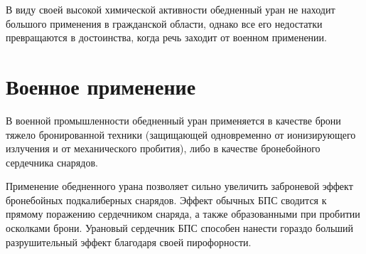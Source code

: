 В виду своей высокой химической активности обедненный уран не находит большого применения в гражданской области, однако все его недостатки превращаются в достоинства, когда речь заходит от военном применении.

\section{Военное применение}
В военной промышленности обедненный уран применяется в качестве брони тяжело бронированной техники (защищающей одновременно от ионизирующего излучения и от механического пробития), либо в качестве бронебойного сердечника снарядов.

Применение обедненного урана позволяет сильно увеличить заброневой эффект бронебойных подкалиберных снарядов. Эффект обычных БПС сводится к прямому поражению сердечником снаряда, а также образованными при пробитии осколками брони. Урановый сердечник БПС способен нанести гораздо больший разрушительный эффект благодаря своей пирофорности.



